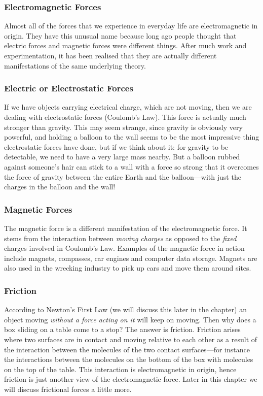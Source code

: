 \subsubsection{Electromagnetic Forces}
Almost all of the forces that we experience in everyday life are
electromagnetic in origin. They have this unusual name because long ago people thought that electric forces and magnetic forces were different things. After much work and experimentation, it has been realised that they are actually different manifestations of the same underlying theory.

\subsubsection{Electric or Electrostatic Forces}
If we have objects carrying electrical charge, which are not moving, then we are dealing with electrostatic forces (Coulomb's Law). This force is actually much stronger than gravity. This may seem strange, since gravity is obviously very powerful, and holding a balloon to the wall seems to be the most impressive thing electrostatic forces have done, but if we think about it: for gravity to be detectable, we need to have a very large mass nearby. But a balloon rubbed against someone's hair can stick to a wall with a force so strong that it overcomes the force of gravity between the entire Earth and the balloon---with just the charges in the balloon and the wall!

\subsubsection{Magnetic Forces}
The magnetic force is a different manifestation of the electromagnetic force. It stems from the interaction between \emph{moving charges} as opposed to the \emph{fixed} charges involved in Coulomb's Law. Examples of the magnetic force in action include magnets, compasses, car engines and computer data storage. Magnets are also used in the wrecking industry to pick up cars and move them around sites.

\subsubsection{Friction}
According to Newton's First Law (we will discuss this later in the chapter) an object moving \emph{without a force acting on it} will keep on moving. Then why does a box sliding on a table come to a stop? The answer is friction. Friction arises where two surfaces are in contact and moving relative to each other as a result of the interaction between the molecules of the two contact surfaces---for instance the interactions between the molecules on the bottom of the box with molecules on the top of the table. This interaction is electromagnetic in origin, hence friction is just another view of the electromagnetic force. Later in this chapter we will discuss frictional forces a little more.

